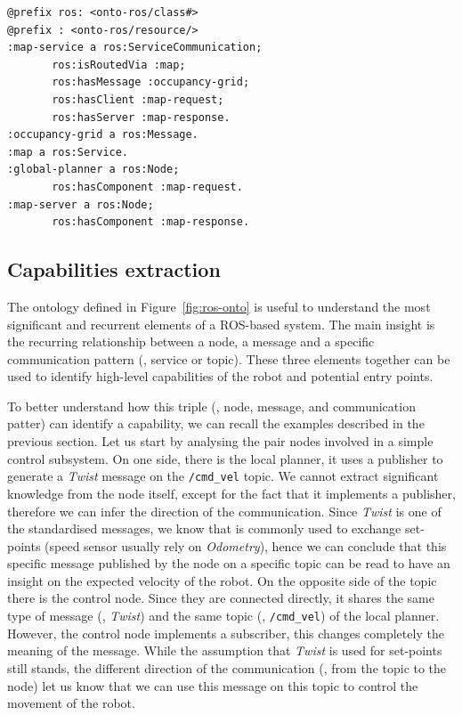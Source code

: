 \begin{lstlisting}[frame=tb,caption={TODO},label=lst:onto-service]
@prefix ros: <onto-ros/class#>
@prefix : <onto-ros/resource/>
:map-service a ros:ServiceCommunication;
       ros:isRoutedVia :map;
       ros:hasMessage :occupancy-grid;
       ros:hasClient :map-request;
       ros:hasServer :map-response.
:occupancy-grid a ros:Message.
:map a ros:Service.  
:global-planner a ros:Node;
       ros:hasComponent :map-request.
:map-server a ros:Node;
       ros:hasComponent :map-response.
 \end{lstlisting}
 
\subsection{Capabilities extraction}
\label{sec:cap-ext}
The ontology defined in Figure~\ref{fig:ros-onto} is useful to understand the most significant and recurrent elements of a ROS-based system. The main insight is the recurring relationship between a node, a message and a specific communication pattern (\ie, service or topic). These three elements together can be used to identify high-level capabilities of the robot and potential entry points.

To better understand how this triple (\ie, node, message, and communication patter) can identify a capability, we can recall the examples described in the previous section. Let us start by analysing the pair nodes involved in a simple control subsystem. On one side, there is the local planner, it uses a publisher to generate a \textit{Twist} message on the \texttt{/cmd\_vel} topic. We cannot extract significant knowledge from the node itself, except for the fact that it implements a publisher, therefore we can infer the direction of the communication. Since \textit{Twist} is one of the standardised messages, we know that is commonly used to exchange set-points (speed sensor usually rely on \textit{Odometry}), hence we can conclude that this specific message published by the node on a specific topic can be read to have an insight on the expected velocity of the robot. On the opposite side of the topic there is the control node. Since they are connected directly, it shares the same type of message (\ie, \textit{Twist}) and the same topic (\ie, \texttt{/cmd\_vel}) of the local planner. However, the control node implements a subscriber, this changes completely the meaning of the message. While the assumption that \textit{Twist} is used for set-points still stands, the different direction of the communication (\ie, from the topic to the node) let us know that we can use this message on this topic to control the movement of the robot.

